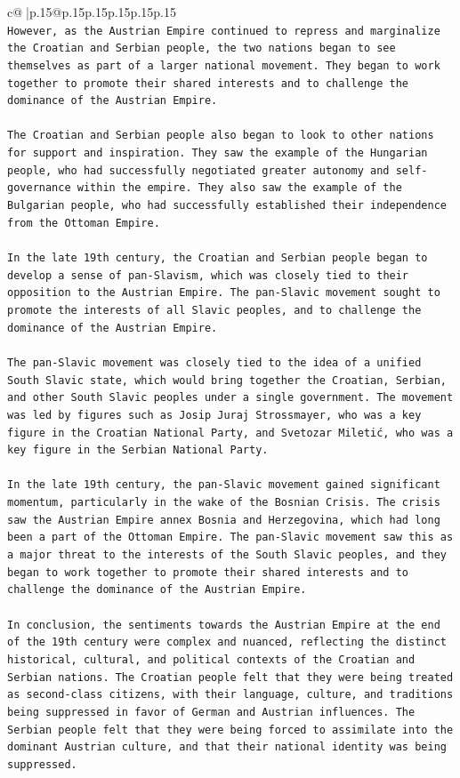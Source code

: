 \documentclass{article}
\begin{document}
{\begin{supertabular}{c@{$\;$}|p{.15\linewidth}@{}p{.15\linewidth}p{.15\linewidth}p{.15\linewidth}p{.15\linewidth}p{.15\linewidth}}
{{{\\ 
\texttt{However, as the Austrian Empire continued to repress and marginalize the Croatian and Serbian people, the two nations began to see themselves as part of a larger national movement. They began to work together to promote their shared interests and to challenge the dominance of the Austrian Empire.} \\
\\ 
\texttt{The Croatian and Serbian people also began to look to other nations for support and inspiration. They saw the example of the Hungarian people, who had successfully negotiated greater autonomy and self{-}governance within the empire. They also saw the example of the Bulgarian people, who had successfully established their independence from the Ottoman Empire.} \\
\\ 
\texttt{In the late 19th century, the Croatian and Serbian people began to develop a sense of pan{-}Slavism, which was closely tied to their opposition to the Austrian Empire. The pan{-}Slavic movement sought to promote the interests of all Slavic peoples, and to challenge the dominance of the Austrian Empire.} \\
\\ 
\texttt{The pan{-}Slavic movement was closely tied to the idea of a unified South Slavic state, which would bring together the Croatian, Serbian, and other South Slavic peoples under a single government. The movement was led by figures such as Josip Juraj Strossmayer, who was a key figure in the Croatian National Party, and Svetozar Miletić, who was a key figure in the Serbian National Party.} \\
\\ 
\texttt{In the late 19th century, the pan{-}Slavic movement gained significant momentum, particularly in the wake of the Bosnian Crisis. The crisis saw the Austrian Empire annex Bosnia and Herzegovina, which had long been a part of the Ottoman Empire. The pan{-}Slavic movement saw this as a major threat to the interests of the South Slavic peoples, and they began to work together to promote their shared interests and to challenge the dominance of the Austrian Empire.} \\
\\ 
\texttt{In conclusion, the sentiments towards the Austrian Empire at the end of the 19th century were complex and nuanced, reflecting the distinct historical, cultural, and political contexts of the Croatian and Serbian nations. The Croatian people felt that they were being treated as second{-}class citizens, with their language, culture, and traditions being suppressed in favor of German and Austrian influences. The Serbian people felt that they were being forced to assimilate into the dominant Austrian culture, and that their national identity was being suppressed.} \\
}}}
\end{supertabular}}
\end{document}
